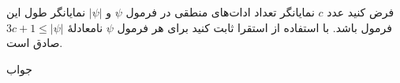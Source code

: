 فرض کنید عدد $c$ نمایانگر تعداد ادات‌های منطقی در فرمول $\psi$ و $|\psi|$ نمایانگر طول این فرمول باشد. با استفاده از استقرا ثابت کنید برای هر فرمول $\psi$ نامعادلهٔ
$3c+1\leq|\psi|$ صادق است.
\begin{ans}
جواب
\end{ans}
